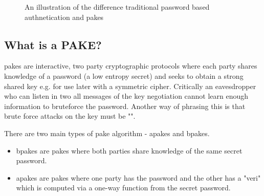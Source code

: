\begin{figure}[H]
  \centering

  \caption{An illustration of the difference traditional password based authnetication and \glspl{pake}}
  \label{fig:tls-vs-pake}
\end{figure}

\clearpage
\subsection{What is a PAKE?}
\glspl{pake} are interactive, two party cryptographic protocols where each party shares knowledge of a password (a low entropy secret) and seeks to obtain a strong shared key e.g. for use later with a symmetric cipher. Critically an eavesdropper who can listen in two all messages of the key negotiation cannot learn enough information to bruteforce the password. Another way of phrasing this is that brute force attacks on the key must be "".

There are two main types of \gls{pake} algorithm - \glspl{apake} and \glspl{bpake}.
\begin{itemize}
  \item \glspl{bpake} are \glspl{pake} where both parties share knowledge of the same secret password.
  \item \glspl{apake} are \glspl{pake} where one party has the password and the other has a "\gls{veri}" which is computed via a one-way function from the secret password.
\end{itemize}

